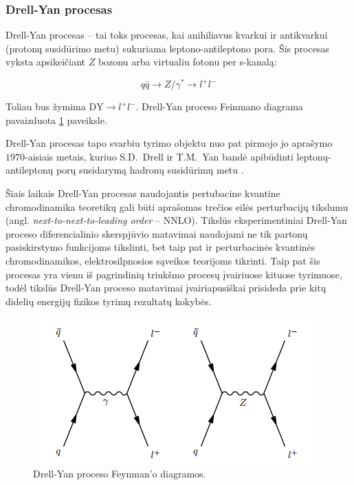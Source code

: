 \documentclass[a4paper, 12pt]{article}
\newcommand{\DY}{\mathrm{DY}}
\newlength\q
\begin{document}
\begin{centering}
\begin{minipage}[t]{0.48\linewidth}
\end{minipage}
\vspace{-0.3cm}
\end{centering}


\subsubsection{Drell-Yan procesas}
Drell-Yan procesas -- tai toks procesas, kai anihiliavus kvarkui ir antikvarkui (protonų susidūrimo
metu) sukuriama leptono-antileptono pora.
Šis procesas vyksta apsikeičiant $Z$ bozonu arba
virtualiu fotonu per s-kanalą:

\begin{equation*}
	q\bar{q} \rightarrow Z/ \gamma^{*} \rightarrow l^{+}l^{-}
\end{equation*}

Toliau bus žymima $\DY \! \rightarrow \! l^{+}l^{-}$. Drell-Yan proceso Feinmano diagrama
pavaizduota \ref{fig:DYfeyn} paveiksle.

Drell-Yan procesas tapo svarbiu tyrimo objektu nuo pat pirmojo jo aprašymo $1970$-aisiais
metais, kuriuo S.D.\ Drell ir T.M.\ Yan bandė apibūdinti leptonų-antileptonų porų susidarymą
hadronų susidūrimų metu \cite{DYoriginal}.

Šiais laikais Drell-Yan procesas naudojantis pertubacine kvantine chromodinamika teoretikų
gali būti aprašomas trečios eilės perturbacijų tikslumu (angl. \textit{next-to-next-to-leading
order} -- NNLO).
Tikslūs eksperimentiniai Drell-Yan proceso diferencialinio skerspjūvio matavimai naudojami
ne tik partonų pasiskirstymo funkcijoms tikslinti, bet taip pat ir perturbacinės kvantinės
chromodinamikos, elektrosilpnosios sąveikos teorijoms tikrinti. Taip pat šis procesas yra vienu iš
pagrindinių triukšmo procesų įvairiuose kituose tyrimuose, todėl tikslūs Drell-Yan proceso matavimai
įvairiapusiškai prisideda prie kitų didelių energijų fizikos tyrimų rezultatų kokybės.

\begin{figure}[H]
\centering
\includegraphics[scale=0.75]{DYprocess.PNG}
\caption{Drell-Yan proceso Feynman'o diagramos.}
\label{fig:DYfeyn}
\end{figure}
\end{document}
